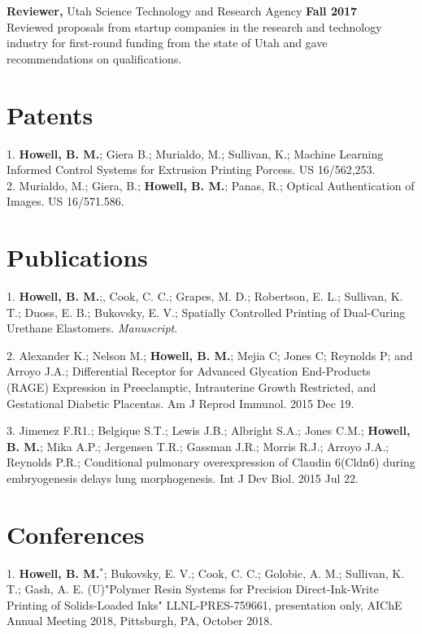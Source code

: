 \documentclass[margin,line]{res}
\begin{document}
\begin{resume}
{\bf Reviewer,} Utah Science Technology and Research Agency
\hfill {\bf Fall 2017}\\
Reviewed proposals from startup companies in the research and technology industry for first-round funding from the state of Utah and gave recommendations on qualifications. 


\section{\sc Patents}
1. \textbf{Howell, B. M.}; Giera B.; Murialdo, M.; Sullivan, K.; Machine Learning Informed Control Systems for Extrusion Printing Porcess. US 16/562,253. \\

2. Murialdo, M.; Giera, B.; \textbf{Howell, B. M.}; Panas, R.; Optical Authentication of Images. US 16/571.586. 

\section{\sc Publications}
1. \textbf{Howell, B. M.};, Cook, C. C.; Grapes, M. D.; Robertson, E. L.; Sullivan, K. T.; Duoss, E. B.; Bukovsky, E. V.; Spatially Controlled Printing of Dual-Curing Urethane Elastomers. \textit{Manuscript}.   

2. Alexander K.; Nelson M.; \textbf{Howell, B. M.}; Mejia C; Jones C; Reynolds P; and Arroyo J.A.; Differential Receptor for Advanced Glycation End-Products (RAGE) Expression in Preeclamptic, Intrauterine Growth Restricted, and Gestational Diabetic Placentas. Am J Reprod Immunol. 2015 Dec 19.

3. Jimenez F.R1.; Belgique S.T.; Lewis J.B.; Albright S.A.; Jones C.M.; \textbf{Howell, B. M.}; Mika A.P.; Jergensen T.R.; Gassman J.R.; Morris R.J.; Arroyo J.A.; Reynolds P.R.; Conditional pulmonary overexpression of Claudin 6(Cldn6) during embryogenesis delays lung morphogenesis. Int J Dev Biol. 2015 Jul 22.

\section{\sc Conferences}
1. \textbf{Howell, B. M.}$^*$; Bukovsky, E. V.; Cook, C. C.; Golobic, A. M.; Sullivan, K. T.; Gash, A. E. (U)"Polymer Resin Systems for Precision Direct-Ink-Write Printing of Solids-Loaded Inks" LLNL-PRES-759661, presentation only, AIChE Annual Meeting 2018, Pittsburgh, PA, October 2018.\\


\end{resume}
\end{document}
